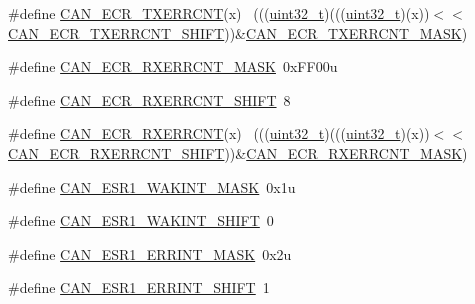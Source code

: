 \begin{DoxyCompactItemize}
\item 
\#define \hyperlink{group___c_a_n___register___masks_ga821c6b239c15bbb81da5c7abe4c92841}{C\+A\+N\+\_\+\+E\+C\+R\+\_\+\+T\+X\+E\+R\+R\+C\+NT}(x)                                        ~(((\hyperlink{_p_e___types_8h_a33594304e786b158f3fb30289278f5af}{uint32\+\_\+t})(((\hyperlink{_p_e___types_8h_a33594304e786b158f3fb30289278f5af}{uint32\+\_\+t})(x))$<$$<$\hyperlink{group___c_a_n___register___masks_ga4f1e9e374563ef6c0502d1a441caf396}{C\+A\+N\+\_\+\+E\+C\+R\+\_\+\+T\+X\+E\+R\+R\+C\+N\+T\+\_\+\+S\+H\+I\+FT}))\&\hyperlink{group___c_a_n___register___masks_gae4da1b026e86291036b8b7d7e78bffa7}{C\+A\+N\+\_\+\+E\+C\+R\+\_\+\+T\+X\+E\+R\+R\+C\+N\+T\+\_\+\+M\+A\+SK})
\item 
\#define \hyperlink{group___c_a_n___register___masks_gaed0f3cf7cea69b12a5166e67ad58b98e}{C\+A\+N\+\_\+\+E\+C\+R\+\_\+\+R\+X\+E\+R\+R\+C\+N\+T\+\_\+\+M\+A\+SK}~0x\+F\+F00u
\item 
\#define \hyperlink{group___c_a_n___register___masks_ga8211d5f10448105a549f3f4085813922}{C\+A\+N\+\_\+\+E\+C\+R\+\_\+\+R\+X\+E\+R\+R\+C\+N\+T\+\_\+\+S\+H\+I\+FT}~8
\item 
\#define \hyperlink{group___c_a_n___register___masks_gafe28c53e9c183d95b4570010e4529a84}{C\+A\+N\+\_\+\+E\+C\+R\+\_\+\+R\+X\+E\+R\+R\+C\+NT}(x)                                        ~(((\hyperlink{_p_e___types_8h_a33594304e786b158f3fb30289278f5af}{uint32\+\_\+t})(((\hyperlink{_p_e___types_8h_a33594304e786b158f3fb30289278f5af}{uint32\+\_\+t})(x))$<$$<$\hyperlink{group___c_a_n___register___masks_ga8211d5f10448105a549f3f4085813922}{C\+A\+N\+\_\+\+E\+C\+R\+\_\+\+R\+X\+E\+R\+R\+C\+N\+T\+\_\+\+S\+H\+I\+FT}))\&\hyperlink{group___c_a_n___register___masks_gaed0f3cf7cea69b12a5166e67ad58b98e}{C\+A\+N\+\_\+\+E\+C\+R\+\_\+\+R\+X\+E\+R\+R\+C\+N\+T\+\_\+\+M\+A\+SK})
\item 
\#define \hyperlink{group___c_a_n___register___masks_gaebf477ebf4b3df88922476e9ac121e06}{C\+A\+N\+\_\+\+E\+S\+R1\+\_\+\+W\+A\+K\+I\+N\+T\+\_\+\+M\+A\+SK}~0x1u
\item 
\#define \hyperlink{group___c_a_n___register___masks_ga146781b97b78d98eb3925860a96cf217}{C\+A\+N\+\_\+\+E\+S\+R1\+\_\+\+W\+A\+K\+I\+N\+T\+\_\+\+S\+H\+I\+FT}~0
\item 
\#define \hyperlink{group___c_a_n___register___masks_ga18448e13304efd0d4fe37d26c60c3a05}{C\+A\+N\+\_\+\+E\+S\+R1\+\_\+\+E\+R\+R\+I\+N\+T\+\_\+\+M\+A\+SK}~0x2u
\item 
\#define \hyperlink{group___c_a_n___register___masks_gacee94f8f13909a6e02234076eecda564}{C\+A\+N\+\_\+\+E\+S\+R1\+\_\+\+E\+R\+R\+I\+N\+T\+\_\+\+S\+H\+I\+FT}~1

\end{DoxyCompactItemize}
